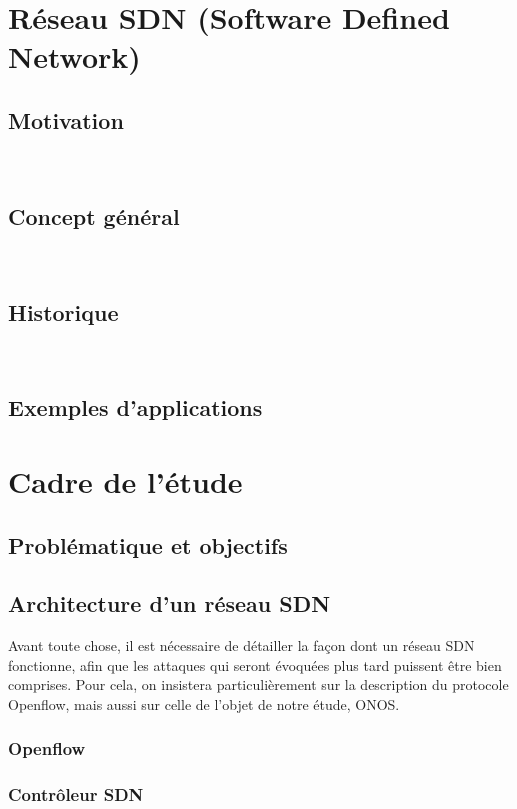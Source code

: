 \documentclass[11pt]{article}
\begin{document}
\newpage
\tableofcontents


\newpage
{}
\section{Réseau SDN (Software Defined Network)}
	\subsection{Motivation}
		
		~\\
	\subsection{Concept général}
		
		~\\
	\subsection{Historique}
		
		~\\
	\subsection{Exemples d'applications}
		
\newpage
{}
\section{Cadre de l'étude}
	\subsection{Problématique et objectifs}
		
	\subsection{Architecture d'un réseau SDN}
		Avant toute chose, il est nécessaire de détailler la façon dont un réseau SDN fonctionne, afin que les attaques qui seront évoquées plus tard puissent être bien comprises. Pour cela, on insistera particulièrement sur la description du protocole Openflow, mais aussi sur celle de l'objet de notre étude, ONOS.
		\subsubsection{Openflow}
			
		\subsubsection{Contrôleur SDN}
			
\end{document}
